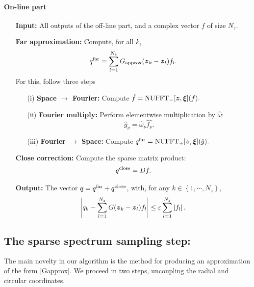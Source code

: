 \documentclass[smallextended]{svjour3}
\begin{document}
\paragraph{On-line part}
\begin{itemize}
	\item[] \textbf{Input:} All outputs of the off-line part, and a complex vector $f$ of size $N_z$. 
	\item[] \textbf{Far approximation:} Compute, for all $k$,
	      \begin{equation}
	      	\label{FarApprox}
	      	q^{\text{far}} = \sum_{l=1}^{N_z} G_{\textup{approx}}(\boldsymbol{z}_k - \boldsymbol{z}_l) f_l.
	      \end{equation} 
	      For this, follow three steps
	      \begin{itemize}
	      	\item[(i)] \textbf{Space $\rightarrow$ Fourier: } Compute $\hat{f} = \textup{NUFFT}_-[\boldsymbol{z},\boldsymbol{\xi}](f).$
	      	\item[(ii)] \textbf{Fourier multiply:} Perform elementwise multiplication by $\hat{\omega}$:
	      	\[{\hat{g}_{\nu} = \hat{\omega}_\nu \hat{f_\nu}.}\]
	      	\item[(iii)] \textbf{Fourier $\rightarrow$ Space: } Compute $q^{\text{far}} =  \textup{NUFFT}_+[\boldsymbol{z},\boldsymbol{\xi}](\hat{g}).$
	      \end{itemize}
	\item[] \textbf{Close correction:} Compute the sparse matrix product:
	      \[q^{\textup{close}} = Df.\]
	\item[] \textbf{Output:} The vector $q = q^{\textup{far}} + q^{\textup{close}}$, with, for any $k \in \left\{1,\cdots,N_z\right\},$	
	      \[ \left\lvert q_k - \sum_{l = 1}^{N_z} G({\boldsymbol{z}_k - \boldsymbol{z}_l}) f_l \right\rvert \leq \varepsilon \sum_{l=1}^{N_z} \left\lvert f_l \right\rvert.\]
\end{itemize}

\subsection*{\textbf{The sparse spectrum sampling step:}}
The main novelty in our algorithm is the method for producing an approximation of the form \eqref{Gapprox}. We proceed in two steps, uncoupling the radial and circular coordinates. 
\end{document}
